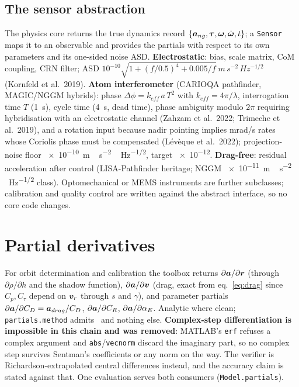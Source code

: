 \subsection{The sensor abstraction}
The physics core returns the true dynamics record $\{\bm{a}_{ng},\bm{\tau},\bm{\omega},\dot{\bm{\omega}},t\}$; a \texttt{Sensor} maps it to an observable and provides the partials with respect to its own parameters and its one-sided noise ASD. \textbf{Electrostatic}: bias, scale matrix, CoM coupling, CRN filter; ASD $10^{-10}\sqrt{1+(f/0.5)^4+0.005/f}\ \si{m\,s^{-2}\,Hz^{-1/2}}$ (Kornfeld et al.\ 2019). \textbf{Atom interferometer} (CARIOQA pathfinder, MAGIC/NGGM hybrids): phase $\Delta\phi=k_{eff}\,a\,T^2$ with $k_{eff}=4\pi/\lambda$, interrogation time $T$ (\SI{1}{\second}), cycle time (\SI{4}{\second}, dead time), phase ambiguity modulo $2\pi$ requiring hybridisation with an electrostatic channel (Zahzam et al.\ 2022; Trimeche et al.\ 2019), and a rotation input because nadir pointing implies mrad/s rates whose Coriolis phase must be compensated (Lévèque et al.\ 2022); projection-noise floor \SI{e-10}{m\,s^{-2}\,Hz^{-1/2}}, target \num{e-12}. \textbf{Drag-free}: residual acceleration after control (LISA-Pathfinder heritage; NGGM \SI{e-11}{m\,s^{-2}\,Hz^{-1/2}} class). Optomechanical or MEMS instruments are further subclasses; calibration and quality control are written against the abstract interface, so no core code changes.

\section{Partial derivatives}
For orbit determination and calibration the toolbox returns $\partial\bm{a}/\partial\bm{r}$ (through $\partial\rho/\partial h$ and the shadow function), $\partial\bm{a}/\partial\bm{v}$ (drag, exact from eq.~\eqref{eq:drag} since $C_p,C_\tau$ depend on $\bm{v}_r$ through $s$ and $\gamma$), and parameter partials $\partial\bm{a}/\partial C_D=\bm{a}_{drag}/C_D$, $\partial\bm{a}/\partial C_R$, $\partial\bm{a}/\partial\alpha_E$. Analytic where clean; \texttt{partials.method} admits \ngfoptpartialsmethod\ and nothing else. \textbf{Complex-step differentiation is impossible in this chain and was removed}: MATLAB's \texttt{erf} refuses a complex argument and \texttt{abs}/\texttt{vecnorm} discard the imaginary part, so no complex step survives Sentman's coefficients or any norm on the way. The verifier is Richardson-extrapolated central differences instead, and the accuracy claim is stated against that. One evaluation serves both consumers (\texttt{Model.partials}).

